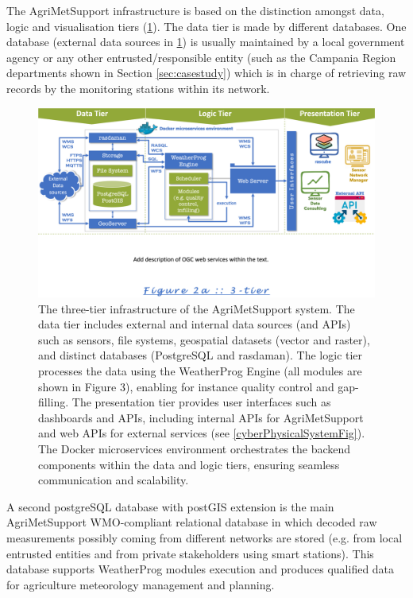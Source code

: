 \documentclass[authoryear,preprint,review,12pt]{elsarticle}
\begin{document}
The AgriMetSupport infrastructure is based on the distinction amongst data, logic and visualisation tiers (\cref{Fig_tiers}).
The data tier is made by different data\-bases.
One database (external data sources in \cref{Fig_tiers}) is usually maintained by a local government agency or any other entrusted/responsible entity (such as the Campania Region departments shown in Section \ref{sec:casestudy}) which is in charge of retrieving raw records by the monitoring stations within its network.
\begin{figure}[!t] %
	\centering %
	\includegraphics[angle=0,scale=.4,trim=0cm 6.2cm 0cm 0cm,clip]{figures/Fig02_Tiers.png}
	\caption{The three-tier infrastructure of the AgriMetSupport system. The data tier includes external and internal data sources (and APIs) such as sensors, file systems, geospatial datasets (vector and raster), and distinct databases (PostgreSQL and rasdaman). The logic tier processes the data using the WeatherProg Engine (all modules are shown in Figure 3), enabling for instance quality control and gap-filling. The presentation tier provides user interfaces such as dashboards and APIs, including internal APIs for Agri\-Met\-Support and web APIs for external services (see \cref{cyberPhysicalSystemFig}). The Docker microservices environment orchestrates the backend components within the data and logic tiers, ensuring seamless communication and scalability.}
	\label{Fig_tiers}
\end{figure}
A second postgreSQL database with postGIS extension is the main Agri\-Met\-Support WMO-compliant relational database  in which decoded raw measurements possibly coming from different networks are stored (e.g. from local entrusted entities and from private stakeholders using smart stations).
This database supports WeatherProg modules execution and produces qualified data for agriculture meteorology management and planning.
\end{document}
